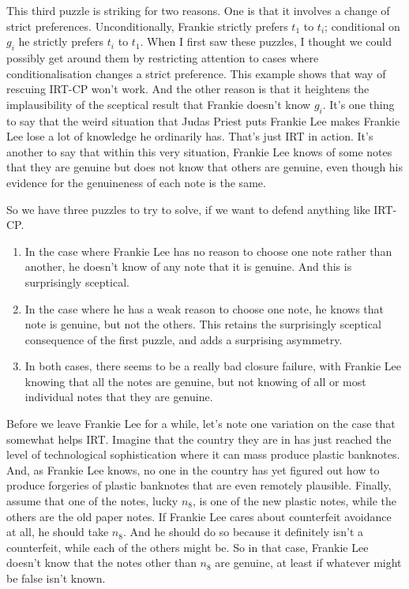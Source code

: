 \documentclass[
  12pt,
]{article}
\providecommand{\tightlist}{%
  \setlength{\itemsep}{0pt}\setlength{\parskip}{0pt}}
\begin{document}
This third puzzle is striking for two reasons. One is that it involves a change of strict preferences. Unconditionally, Frankie strictly prefers \(t_1\) to \(t_i\); conditional on \(g_i\) he strictly prefers \(t_i\) to \(t_1\). When I first saw these puzzles, I thought we could possibly get around them by restricting attention to cases where conditionalisation changes a strict preference. This example shows that way of rescuing IRT-CP won't work. And the other reason is that it heightens the implausibility of the sceptical result that Frankie doesn't know \(g_i\). It's one thing to say that the weird situation that Judas Priest puts Frankie Lee makes Frankie Lee lose a lot of knowledge he ordinarily has. That's just IRT in action. It's another to say that within this very situation, Frankie Lee knows of some notes that they are genuine but does not know that others are genuine, even though his evidence for the genuineness of each note is the same.

So we have three puzzles to try to solve, if we want to defend anything like IRT-CP.

\begin{enumerate}
\def\labelenumi{\arabic{enumi}.}
\tightlist
\item
  In the case where Frankie Lee has no reason to choose one note rather than another, he doesn't know of any note that it is genuine. And this is surprisingly sceptical.
\item
  In the case where he has a weak reason to choose one note, he knows that note is genuine, but not the others. This retains the surprisingly sceptical consequence of the first puzzle, and adds a surprising asymmetry.
\item
  In both cases, there seems to be a really bad closure failure, with Frankie Lee knowing that all the notes are genuine, but not knowing of all or most individual notes that they are genuine.
\end{enumerate}

Before we leave Frankie Lee for a while, let's note one variation on the case that somewhat helps IRT. Imagine that the country they are in has just reached the level of technological sophistication where it can mass produce plastic banknotes. And, as Frankie Lee knows, no one in the country has yet figured out how to produce forgeries of plastic banknotes that are even remotely plausible. Finally, assume that one of the notes, lucky \(n_8\), is one of the new plastic notes, while the others are the old paper notes. If Frankie Lee cares about counterfeit avoidance at all, he should take \(n_8\). And he should do so because it definitely isn't a counterfeit, while each of the others might be. So in that case, Frankie Lee doesn't know that the notes other than \(n_8\) are genuine, at least if whatever might be false isn't known.
\end{document}
